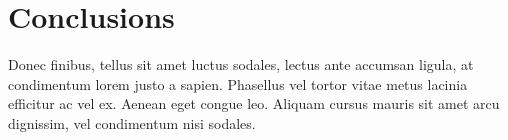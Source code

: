 \documentclass[12pt, twocolumn]{revtex4}    %
\begin{document}
\section{Conclusions}
Donec finibus, tellus sit amet luctus sodales, lectus ante accumsan ligula, at condimentum lorem justo a sapien. Phasellus vel tortor vitae metus lacinia efficitur ac vel ex. Aenean eget congue leo. Aliquam cursus mauris sit amet arcu dignissim, vel condimentum nisi sodales. 



\end{document}

